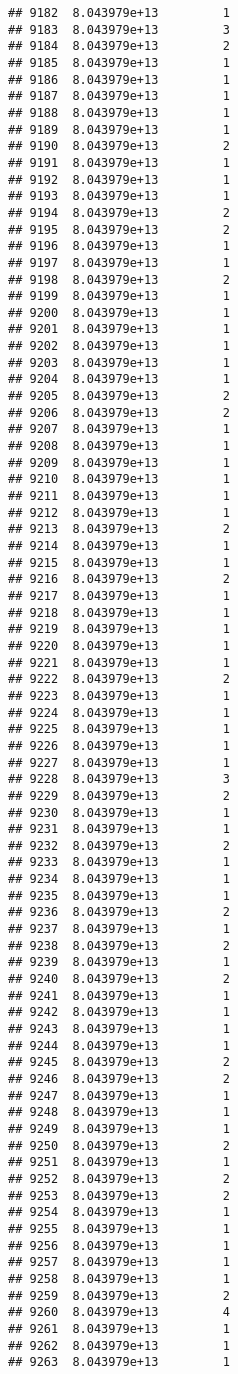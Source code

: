 \documentclass[
]{article}
\begin{document}
\begin{verbatim}
## 9182  8.043979e+13         1
## 9183  8.043979e+13         3
## 9184  8.043979e+13         2
## 9185  8.043979e+13         1
## 9186  8.043979e+13         1
## 9187  8.043979e+13         1
## 9188  8.043979e+13         1
## 9189  8.043979e+13         1
## 9190  8.043979e+13         2
## 9191  8.043979e+13         1
## 9192  8.043979e+13         1
## 9193  8.043979e+13         1
## 9194  8.043979e+13         2
## 9195  8.043979e+13         2
## 9196  8.043979e+13         1
## 9197  8.043979e+13         1
## 9198  8.043979e+13         2
## 9199  8.043979e+13         1
## 9200  8.043979e+13         1
## 9201  8.043979e+13         1
## 9202  8.043979e+13         1
## 9203  8.043979e+13         1
## 9204  8.043979e+13         1
## 9205  8.043979e+13         2
## 9206  8.043979e+13         2
## 9207  8.043979e+13         1
## 9208  8.043979e+13         1
## 9209  8.043979e+13         1
## 9210  8.043979e+13         1
## 9211  8.043979e+13         1
## 9212  8.043979e+13         1
## 9213  8.043979e+13         2
## 9214  8.043979e+13         1
## 9215  8.043979e+13         1
## 9216  8.043979e+13         2
## 9217  8.043979e+13         1
## 9218  8.043979e+13         1
## 9219  8.043979e+13         1
## 9220  8.043979e+13         1
## 9221  8.043979e+13         1
## 9222  8.043979e+13         2
## 9223  8.043979e+13         1
## 9224  8.043979e+13         1
## 9225  8.043979e+13         1
## 9226  8.043979e+13         1
## 9227  8.043979e+13         1
## 9228  8.043979e+13         3
## 9229  8.043979e+13         2
## 9230  8.043979e+13         1
## 9231  8.043979e+13         1
## 9232  8.043979e+13         2
## 9233  8.043979e+13         1
## 9234  8.043979e+13         1
## 9235  8.043979e+13         1
## 9236  8.043979e+13         2
## 9237  8.043979e+13         1
## 9238  8.043979e+13         2
## 9239  8.043979e+13         1
## 9240  8.043979e+13         2
## 9241  8.043979e+13         1
## 9242  8.043979e+13         1
## 9243  8.043979e+13         1
## 9244  8.043979e+13         1
## 9245  8.043979e+13         2
## 9246  8.043979e+13         2
## 9247  8.043979e+13         1
## 9248  8.043979e+13         1
## 9249  8.043979e+13         1
## 9250  8.043979e+13         2
## 9251  8.043979e+13         1
## 9252  8.043979e+13         2
## 9253  8.043979e+13         2
## 9254  8.043979e+13         1
## 9255  8.043979e+13         1
## 9256  8.043979e+13         1
## 9257  8.043979e+13         1
## 9258  8.043979e+13         1
## 9259  8.043979e+13         2
## 9260  8.043979e+13         4
## 9261  8.043979e+13         1
## 9262  8.043979e+13         1
## 9263  8.043979e+13         1

\end{verbatim}
\end{document}
